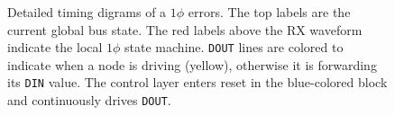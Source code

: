 \begin{figure}[h]
\begin{subfigure}{\textwidth}
\begin{comment}
          \def\base{57}
          \pgfmathparse{\base+0}
          \node [rotate=45] at (\pgfmathresult, 0)  {D1};
          \pgfmathparse{\pgfmathresult+8}
          \node [rotate=45] at (\pgfmathresult, 0)  {L1};
          \pgfmathparse{\pgfmathresult+8}
          \node [rotate=45] at (\pgfmathresult, 0)  {D2};
          \pgfmathparse{\pgfmathresult+8}
          \node [rotate=45] at (\pgfmathresult, 0)  {L2};
          \pgfmathparse{\pgfmathresult+8}
          \node [rotate=45] at (\pgfmathresult, 0)  {D1};
          \pgfmathparse{\pgfmathresult+8}
          \node [rotate=45] at (\pgfmathresult, 0)  {L1};
          \pgfmathparse{\pgfmathresult+8}
          \node [rotate=45] at (\pgfmathresult, 0)  {**};
          \pgfmathparse{\pgfmathresult+8}
        \end{scope}
        \begin{scope}
          [font=\sc\tiny,anchor=north,shift={(0,3em)},color=blue]
          \def\base{53}
          \pgfmathparse{\base+0}
          \node [rotate=45] at (\pgfmathresult, 0)  {R0-D};
          \pgfmathparse{\pgfmathresult+8}
          \node [rotate=45] at (\pgfmathresult, 0)  {R0-L};
          \pgfmathparse{\pgfmathresult+8}
          \node [rotate=45] at (\pgfmathresult, 0)  {R1-D};
          \pgfmathparse{\pgfmathresult+8}
          \node [rotate=45] at (\pgfmathresult, 0)  {R1-L};
          \pgfmathparse{\pgfmathresult+8}
          \node [rotate=45] at (\pgfmathresult, 0)  {R0-D};
          \pgfmathparse{\pgfmathresult+8}
          \node [rotate=45] at (\pgfmathresult, 0)  {R0-L};
          \pgfmathparse{\pgfmathresult+9}
          \node [rotate=45] at (\pgfmathresult, 0)  {R1-I1};
          \pgfmathparse{\pgfmathresult+8}
          \node [rotate=45] at (\pgfmathresult, 0)  {R1-I2};
        \end{scope}
    \end{tikztimingtable}
    \caption{Uncertainty can occur if the $1\phi$ slip is too late. In
      particular, if the slip occurs during the Acknowledgement phase, the
      result is non-deterministic. At time 11, the TX node may latch a {\tt 0},
      in which case the transmission will succeed. If it latches a {\tt 1},
      however, the TX node will consider the transmission a failure while the
      RX node will believe it sucessfully ACK'd and will forward the message
      as fully received. The bus is still correctly reset and re-aligned at
      the end of the transmission.
    }
    \label{fig:1-phi-last-chance}

\end{comment}

\end{subfigure}
\caption{Detailed timing digrams of a $1\phi$ errors. The top labels are the
current global bus state. The red labels above the RX waveform indicate the
local $1\phi$ state machine. {\tt DOUT} lines are colored to indicate when a
node is driving (yellow), otherwise it is forwarding its {\tt DIN} value. The
control layer enters reset in the blue-colored block and continuously drives
{\tt DOUT}.
}
\label{fig:reset-1phi-tx-0-1}
\end{figure}

